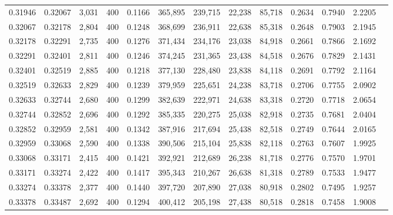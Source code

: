 \begin{tabular}{rrrrrrrrrrrrr}
0.31946 & 0.32067 &  3,031 &   400 &                                     0.1166 & 365,895 & 239,715 &  22,238 &  85,718 & 0.2634 & 0.7940 & 2.2205 \\
0.32067 & 0.32178 &  2,804 &   400 &                                     0.1248 & 368,699 & 236,911 &  22,638 &  85,318 & 0.2648 & 0.7903 & 2.1945 \\
0.32178 & 0.32291 &  2,735 &   400 &                                     0.1276 & 371,434 & 234,176 &  23,038 &  84,918 & 0.2661 & 0.7866 & 2.1692 \\
0.32291 & 0.32401 &  2,811 &   400 &                                     0.1246 & 374,245 & 231,365 &  23,438 &  84,518 & 0.2676 & 0.7829 & 2.1431 \\
0.32401 & 0.32519 &  2,885 &   400 &                                     0.1218 & 377,130 & 228,480 &  23,838 &  84,118 & 0.2691 & 0.7792 & 2.1164 \\
0.32519 & 0.32633 &  2,829 &   400 &                                     0.1239 & 379,959 & 225,651 &  24,238 &  83,718 & 0.2706 & 0.7755 & 2.0902 \\
0.32633 & 0.32744 &  2,680 &   400 &                                     0.1299 & 382,639 & 222,971 &  24,638 &  83,318 & 0.2720 & 0.7718 & 2.0654 \\
0.32744 & 0.32852 &  2,696 &   400 &                                     0.1292 & 385,335 & 220,275 &  25,038 &  82,918 & 0.2735 & 0.7681 & 2.0404 \\
0.32852 & 0.32959 &  2,581 &   400 &                                     0.1342 & 387,916 & 217,694 &  25,438 &  82,518 & 0.2749 & 0.7644 & 2.0165 \\
0.32959 & 0.33068 &  2,590 &   400 &                                     0.1338 & 390,506 & 215,104 &  25,838 &  82,118 & 0.2763 & 0.7607 & 1.9925 \\
0.33068 & 0.33171 &  2,415 &   400 &                                     0.1421 & 392,921 & 212,689 &  26,238 &  81,718 & 0.2776 & 0.7570 & 1.9701 \\
0.33171 & 0.33274 &  2,422 &   400 &                                     0.1417 & 395,343 & 210,267 &  26,638 &  81,318 & 0.2789 & 0.7533 & 1.9477 \\
0.33274 & 0.33378 &  2,377 &   400 &                                     0.1440 & 397,720 & 207,890 &  27,038 &  80,918 & 0.2802 & 0.7495 & 1.9257 \\
0.33378 & 0.33487 &  2,692 &   400 &                                     0.1294 & 400,412 & 205,198 &  27,438 &  80,518 & 0.2818 & 0.7458 & 1.9008 \\

\end{tabular}

